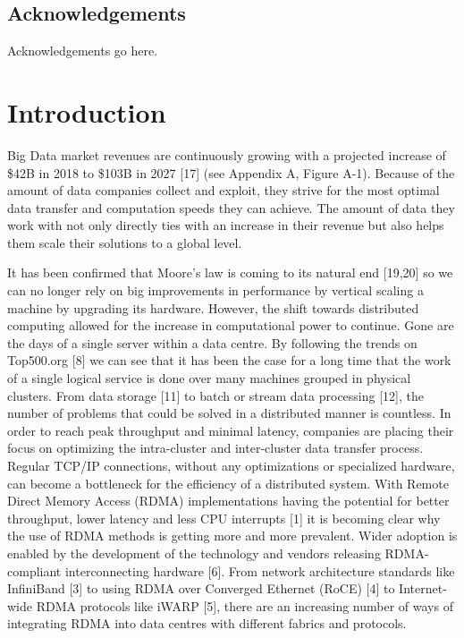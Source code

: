 \documentclass[bsc,frontabs,twoside,singlespacing,parskip,deptreport,hidel]{infthesis}     %
\begin{document}
\maketitle

\section*{Acknowledgements}
Acknowledgements go here. 

\tableofcontents


\chapter{Introduction}

Big Data market revenues are continuously growing with a projected increase of \$42B in 2018 to \$103B in 2027 [17] (see Appendix A, Figure A-1). Because of the amount of data companies collect and exploit, they strive for the most optimal data transfer and computation speeds they can achieve. The amount of data they work with not only directly ties with an increase in their revenue but also helps them scale their solutions to a global level. 

It has been confirmed that Moore’s law is coming to its natural end [19,20] so we can no longer rely on big improvements in performance by vertical scaling a machine by upgrading its hardware. However, the shift towards distributed computing allowed for the increase in computational power to continue. Gone are the days of a single server within a data centre. By following the trends on Top500.org [8] we can see that it has been the case for a long time that the work of a single logical service is done over many machines grouped in physical clusters. From data storage [11] to batch or stream data processing [12], the number of problems that could be solved in a distributed manner is countless. In order to reach peak throughput and minimal latency, companies are placing their focus on optimizing the intra-cluster and inter-cluster data transfer process.  Regular TCP/IP connections, without any optimizations or specialized hardware, can become a bottleneck for the efficiency of a distributed system. With Remote Direct Memory Access (RDMA) implementations having the potential for better throughput, lower latency and less CPU interrupts [1] it is becoming clear why the use of RDMA methods is getting more and more prevalent.  Wider adoption is enabled by the development of the technology and vendors releasing RDMA-compliant interconnecting hardware [6]. From network architecture standards like InfiniBand [3] to using RDMA over Converged Ethernet (RoCE) [4] to Internet-wide RDMA protocols like iWARP [5], there are an increasing number of ways of integrating RDMA into data centres with different fabrics and protocols.
\end{document}
